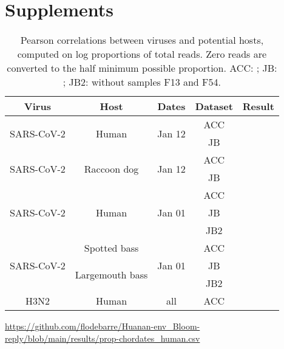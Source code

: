 \documentclass[11pt]{article}
\def \sct {\mbox{SARS-CoV-2}}
\begin{document}
\clearpage
\section*{Supplements}
\appendix 

\setcounter{table}{0}
\renewcommand{\thetable}{S\arabic{table}}

\setcounter{figure}{0}
\renewcommand{\thefigure}{S\arabic{figure}}

\begin{table}[h!]
{\small
\def \sepline {0.75em}
\begin{tabular}{c  c  c  c  l}
\bf Virus & \bf Host & \bf Dates & \bf Dataset & \bf Result \\ \hline
\multirow{2}{*}{\sct{}} & \multirow{2}{*}{Human} & \multirow{2}{*}{Jan 12} & ACC & \ACCTwelfthSCHS{} \\
&&& JB &  \JBTwelfthSCHS{} \\[\sepline]
\multirow{2}{*}{\sct{}} & \multirow{2}{*}{Raccoon dog} & \multirow{2}{*}{Jan 12} & ACC & \ACCTwelfthSCRD{} \\
&&& JB &  \JBTwelfthSCRD{} \\[\sepline]
\multirow{3}{*}{\sct{}} & \multirow{3}{*}{Human} & \multirow{3}{*}{Jan 01} & ACC & \ACCFirstSCHS{} \\
&&& JB &  \JBFirstSCHS{} \\
&&& JB2 &  \JBFirstSCHStwo{} \\[\sepline]
%
\multirow{3}{*}{\sct{}} & Spotted bass& \multirow{3}{*}{Jan 01} & ACC & \ACCFirstSCSB{} \\
& \multirow{2}{*}{Largemouth bass} && JB &  \JBFirstSCLB{} \\
& && JB2 &  \JBFirstSCLBtwo{} \\
[\sepline]
\multirow{1}{*}{H3N2} & \multirow{1}{*}{Human} & \multirow{1}{*}{all} & ACC & \ACCAllHNHS{} \\[\sepline] %
\end{tabular}
}
\caption{Pearson correlations between viruses and potential hosts, computed on log proportions of total reads. Zero reads are converted to the half minimum possible proportion. ACC: \citet{ACC2023bioRxiv}; JB: \citet{Bloom2023VE}; JB2:  \citet{Bloom2023VE} without samples F13 and F54. }
\label{tab:summarycor}
\end{table}

\vspace{1cm}

\begin{table}[h!]
\url{https://github.com/flodebarre/Huanan-env_Bloom-reply/blob/main/results/prop-chordates_human.csv}
\caption{Proportion of human reads among chordate reads, in samples with and without \sct{} reads; data from \citet{Bloom2023VE}. }
\label{tab:propHuman}
\end{table}
\end{document}
